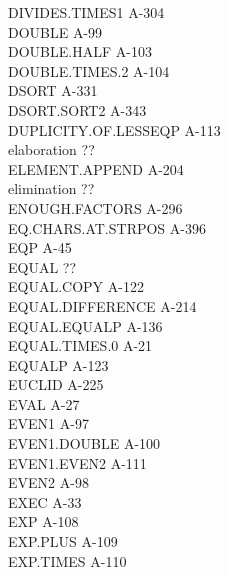 \documentclass[10pt]{book}
\newenvironment{pubasis}{\begin{flushleft}}{\end{flushleft}}
\begin{document}
\begin{pubasis}
DIVIDES.TIMES1                               A-304\\
DOUBLE                                       A-99\\
DOUBLE.HALF                                  A-103\\
DOUBLE.TIMES.2                               A-104\\
DSORT                                        A-331\\
DSORT.SORT2                                  A-343\\
DUPLICITY.OF.LESSEQP                         A-113\\
elaboration                                  ??\\
ELEMENT.APPEND                               A-204\\
elimination                                  ??\\
ENOUGH.FACTORS                               A-296\\
EQ.CHARS.AT.STRPOS                           A-396\\
EQP                                          A-45\\
EQUAL                                        ??\\
EQUAL.COPY                                   A-122\\
EQUAL.DIFFERENCE                             A-214\\
EQUAL.EQUALP                                 A-136\\
EQUAL.TIMES.0                                A-21\\
EQUALP                                       A-123\\
EUCLID                                       A-225\\
EVAL                                         A-27\\
EVEN1                                        A-97\\
EVEN1.DOUBLE                                 A-100\\
EVEN1.EVEN2                                  A-111\\
EVEN2                                        A-98\\
EXEC                                         A-33\\
EXP                                          A-108\\
EXP.PLUS                                     A-109\\
EXP.TIMES                                    A-110\\

\end{pubasis}
\end{document}
